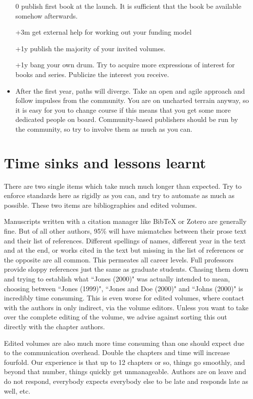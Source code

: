 \documentclass[nonflat,modfonts,output=book] {langsci/langscibook}
\begin{document}
\begin{itemize}
 \item[0] publish first book at the launch. It is sufficient that the book be available somehow afterwards. 
 \item[+3m] get external help for working out your funding model
 \item[+1y] publish the majority of your invited volumes. 
 \item[+1y] bang your own drum. Try to acquire more expressions of interest for books and series. Publicize the interest you receive. 
 \item After the first year, paths will diverge. Take an open and agile approach and follow impulses from the community. You are on uncharted terrain anyway, so it is easy for you to change course if this means that you get some more dedicated people on board. Community-based publishers should be run by the community, so try to involve them as much as you can.
\end{itemize}


\chapter{Time sinks and lessons learnt}
There are two single items which take much much longer than expected. Try to enforce standards here as rigidly as you can, and try to automate as much as possible. These two items are bibliographies and edited volumes. 

Manuscripts written with a citation manager like BibTeX or Zotero are generally fine. But of all other authors, 95\% will have mismatches between their prose text and their list of references. Different spellings of names, different year in the text and at the end, or works cited in the text but missing in the list of references or the opposite are all common. This permeates all career levels. Full professors provide sloppy references just the same as graduate students. Chasing them down and trying to establish what ``Jones (2000)" was actually intended to mean, choosing between ``Jones (1999)", ``Jones and Doe (2000)" and ``Johns (2000)" is incredibly time consuming. This is even worse for edited volumes, where contact with the authors in only indirect, via the volume editors. Unless you want to take over the complete editing of the volume, we advise against sorting this out directly with the chapter authors. 

Edited volumes are also much more  time consuming than one should expect due to the communication overhead. Double the chapters and time will increase fourfold. Our experience is that up to 12 chapters or so, things go smoothly, and beyond that number, things quickly get unmanageable. Authors are on leave and do not respond, everybody expects everybody else to be late and responds late as well, etc. 
 
\end{document}
